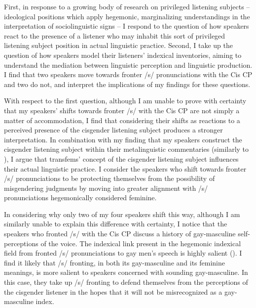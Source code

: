 \documentclass[12pt,twoside]{reedthesis}
\begin{document}
First, in response to a growing body of research on privileged listening subjects -- ideological positions which apply hegemonic, marginalizing understandings in the interpretation of sociolinguistic signs -- I respond to the question of how speakers react to the presence of a listener who may inhabit this sort of privileged listening subject position in actual linguistic practice. Second, I take up the question of how speakers model their listeners' indexical inventories, aiming to understand the mediation between linguistic perception and linguistic production. I find that two speakers move towards fronter /s/ pronunciations with the Cis CP and two do not, and interpret the implications of my findings for these questions.

With respect to the first question, although I am unable to prove with certainty that my speakers' shifts towards fronter /s/ with the Cis CP are not simply a matter of accommodation, I find that considering their shifts as reactions to a perceived presence of the cisgender listening subject produces a stronger interpretation. In combination with my finding that my speakers construct the cisgender listening subject within their metalinguistic commentaries (similarly to \cite{heffernan_constructing_2023}), I argue that transfems' concept of the cisgender listening subject influences their actual linguistic practice. I consider the speakers who shift towards fronter /s/ pronunciations to be protecting themselves from the possibility of misgendering judgments by moving into greater alignment with /s/ pronunciations hegemonically considered feminine.

In considering why only two of my four speakers shift this way, although I am similarly unable to explain this difference with certainty, I notice that the speakers who fronted /s/ with the Cis CP discuss a history of gay-masculine self-perceptions of the voice. The indexical link present in the hegemonic indexical field from fronted /s/ pronunciations to gay men's speech is highly salient (\cite{calder_from_2020}). I find it likely that /s/ fronting, in both its gay-masculine and its feminine meanings, is more salient to speakers concerned with sounding gay-masculine. In this case, they take up /s/ fronting to defend themselves from the perceptions of the cisgender listener in the hopes that it will not be misrecognized as a gay-masculine index.
\end{document}
